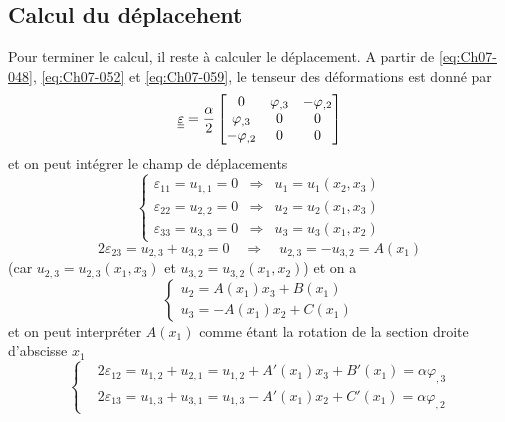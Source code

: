 \subsection{Calcul du déplacehent} \label{ssec:Ch07-2.3}
Pour terminer le calcul, il reste à calculer le déplacement.
A partir de \eqref{eq:Ch07-048}, \eqref{eq:Ch07-052} et \eqref{eq:Ch07-059}, le tenseur des déformations est donné par
\begin{equation}
    \underline{\underline{\varepsilon}} = 
    \frac{\alpha}{2} 
    \begin{bmatrix}
        0 & \varphi_{,3} & -\varphi_{,2} \\
        \varphi_{,3} & 0 & 0 \\
        -\varphi_{,2} & 0 & 0
    \end{bmatrix}
    \label{eq:Ch07-069}
\end{equation}
et on peut intégrer le champ de déplacements
\begin{equation}
    \left\{
    \begin{aligned}
        \varepsilon_{11} = u_{1,1} = 0 & \Rightarrow & u_1 =u_1 \left( x_2,x_3 \right) \\
        \varepsilon_{22} = u_{2,2} = 0 & \Rightarrow & u_2 =u_2 \left( x_1,x_3 \right) \\
        \varepsilon_{33} = u_{3,3} = 0 & \Rightarrow & u_3 =u_3 \left( x_1,x_2 \right)
    \end{aligned}
    \right.
    \label{eq:Ch07-070}
\end{equation}
\[
2\varepsilon_{23} = u_{2,3} + u_{3,2} =0 \quad \Rightarrow \quad u_{2,3} = - u_{3,2} = A(x_1)
\]
(car $u_{2,3} = u_{2,3}(x_1,x_3)$ et $u_{3,2} = u_{3,2} (x_1,x_2)$) et on a
\begin{equation}
    \left\{
    \begin{aligned}
        u_2 = A(x_1) x_3 + B(x_1)\\
        u_3 = -A(x_1) x_2 + C(x_1)
    \end{aligned}
    \right.
    \label{eq:Ch07-071} 
\end{equation}
et on peut interpréter $A(x_1)$ comme étant la rotation de la section droite d'abscisse $x_1$
\begin{equation}
    \left\{
    \begin{aligned}
        &2\varepsilon_{12} = u_{1,2} + u_{2,1} = u_{1,2} + A'(x_1) x_3 + B'(x_1) = \alpha \varphi_{,3}\\
        &2\varepsilon_{13} = u_{1,3} + u_{3,1} = u_{1,3} - A'(x_1) x_2 + C'(x_1) = \alpha \varphi_{,2}
    \end{aligned}
    \right.
    \label{eq:Ch07-072}
\end{equation}
